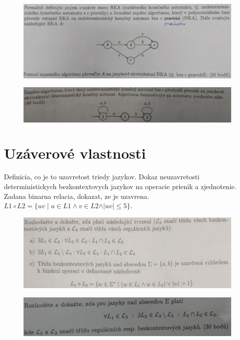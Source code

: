 \documentclass[]{article}
\begin{document}
	\begin{figure}[H]
		\includegraphics[width=\textwidth]{tasks/algoritmy/task2.png}
	\end{figure}
	
	\begin{figure}[H]
		\includegraphics[width=\textwidth]{tasks/algoritmy/task3.png}
	\end{figure}
	
	\section{Uzáverové vlastnosti}
	
	Definicia, co je to uzavretost triedy jazykov. Dokaz neuzavretosti deterministickych bezkontextovych jazykov na operacie prienik a zjednotenie. Zadana binarna relacia, dokazat, ze je uzavrena. $L1 \circ L2 = \{uv \mid u \in L1 \land v \in L2 \land \vert uv \vert \leq 5\}$.
	
	\begin{figure}[H]
		\includegraphics[width=\textwidth]{tasks/vlastnosti/task1.png}
	\end{figure}

	\begin{figure}[H]
		\includegraphics[width=\textwidth]{tasks/vlastnosti/task2.png}
	\end{figure}
	
\end{document}
